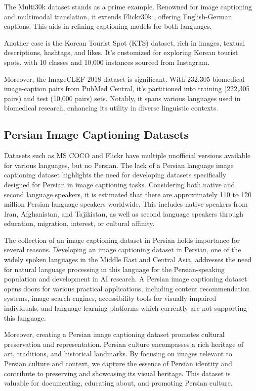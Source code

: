 \documentclass[runningheads]{llncs}
\begin{document}
The Multi30k dataset \cite{Multi30k} stands as a prime example. Renowned for image captioning and multimodal translation, it extends Flickr30k \cite{Flickr30k}, offering English-German captions. This aids in refining captioning models for both languages.

Another case is the Korean Tourist Spot (KTS) \cite{Korean} dataset, rich in images, textual descriptions, hashtags, and likes. It's customized for exploring Korean tourist spots, with 10 classes and 10,000 instances sourced from Instagram.

Moreover, the ImageCLEF 2018 \cite{ImageCLEF2018} dataset is significant. With 232,305 biomedical image-caption pairs from PubMed Central, it's partitioned into training (222,305 pairs) and test (10,000 pairs) sets. Notably, it spans various languages used in biomedical research, enhancing its utility in diverse linguistic contexts.

\subsection{Persian Image Captioning Datasets}
Datasets such as MS COCO and Flickr have multiple unofficial versions available for various languages, but no Persian. The lack of a Persian language image captioning dataset highlights the need for developing datasets specifically designed for Persian in image captioning tasks. Considering both native and second language speakers, it is estimated that there are approximately 110 to 120 million Persian language speakers worldwide. This includes native speakers from Iran, Afghanistan, and Tajikistan, as well as second language speakers through education, migration, interest, or cultural affinity.

The collection of an image captioning dataset in Persian holds importance for several reasons. Developing an image captioning dataset in Persian, one of the widely spoken languages in the Middle East and Central Asia, addresses the need for natural language processing in this language for the Persian-speaking population and development in AI research. A Persian image captioning dataset opens doors for various practical applications, including content recommendation systems, image search engines, accessibility tools for visually impaired individuals, and language learning platforms which currently are not supporting this language.

Moreover, creating a Persian image captioning dataset promotes cultural preservation and representation. Persian culture encompasses a rich heritage of art, traditions, and historical landmarks. By focusing on images relevant to Persian culture and context, we capture the essence of Persian identity and contribute to preserving and showcasing its visual heritage. This dataset is valuable for documenting, educating about, and promoting Persian culture.
\end{document}

